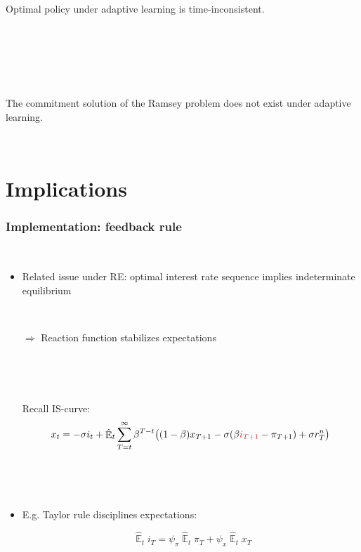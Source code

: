 \documentclass[11pt]{beamer}
\DeclareMathOperator{\E}{\mathbb{E}}
\begin{document}
\begin{frame}
	\frametitle{}
	\label{no_commitment}

\begin{corollary} Optimal policy under adaptive learning is time-inconsistent. 
\end{corollary}


\

\

\

\begin{lemma} The commitment solution of the Ramsey problem does not exist under adaptive learning. 
\end{lemma}


\

\vfill

\hfill \hyperlink{no_commitment_intuition}{}


\end{frame}





\section{Implications}


\begin{frame}
	\frametitle{Implementation: feedback rule}

\	
	\begin{itemize}
	\item Related issue under RE: optimal interest rate sequence implies indeterminate equilibrium
	
	\
	
	\item[$\Rightarrow$] Reaction function stabilizes expectations
	
	\
	
	\
	
	\item[] Recall IS-curve:
	\begin{equation*}
	x_t =  -\sigma i_t +\hat{\E}_t \sum_{T=t}^{\infty} \beta^{T-t }\big( (1-\beta)x_{T+1} - \sigma(\beta \textcolor{brownreddark}{i_{T+1}} - \pi_{T+1}) +\sigma r_T^n \big) 
	\end{equation*}
	
	\
	
	\
	
	\item E.g. Taylor rule disciplines expectations:
	
	 $$\; \hat{\E}_t i_T = \psi_{\pi}\hat{\E}_t\pi_{T}+\psi_{x}\hat{\E}_tx_{T}$$
	\end{itemize}


\end{frame}
\end{document}
